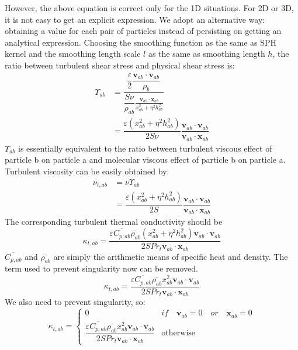 However, the above equation is correct only for the 1D situations. For 2D or 3D, it is not easy to get an explicit expression. 
We adopt an alternative way: obtaining a value for each pair of particles instead of persisting on getting an analytical expression. Choosing the smoothing function as the same as SPH kernel and the smoothing length scale $l$ as the same as smoothing length $h$, the ratio between turbulent shear stress and physical shear stress is: 
\begin{equation}
\begin{split}
\Upsilon_{ab} &= \dfrac{\dfrac{\varepsilon}{2} \dfrac{\textbf{v}_{ab} \cdot \textbf{v}_{ab}}{\rho_b}}{\dfrac{S \nu}{\rho_{ab}} \frac{\textbf{v}_{ab} \cdot \textbf{x}_{ab}}{x_{ab}^2 + \eta^2 h_{ab}^2}} \\
 & = \dfrac{\varepsilon \left(x_{ab}^2 + \eta^2 h_{ab}^2\right)}{2 S \nu} \dfrac{\textbf{v}_{ab} \cdot \textbf{v}_{ab}}{\textbf{v}_{ab} \cdot \textbf{x}_{ab}}
\end{split}
\end{equation}
$\Upsilon_{ab}$ is essentially equivalent to the ratio between turbulent viscous effect of particle b on particle a and molecular viscous effect of particle b on particle a. Turbulent viscosity can be easily obtained by:
\begin{equation}
\begin{split}
\nu_{t,ab} &= \nu \Upsilon_{ab} \\
&= \dfrac{\varepsilon \left(x_{ab}^2 + \eta^2 h_{ab}^2\right)}{2 S} \dfrac{\textbf{v}_{ab} \cdot \textbf{v}_{ab}}{\textbf{v}_{ab} \cdot \textbf{x}_{ab}}
\end{split}
\end{equation}
The corresponding turbulent thermal conductivity should be
\begin{equation}
\kappa_{t,ab}=\dfrac{\varepsilon \overline{C_{p,ab}} \overline{\rho_{ab}} \left(x_{ab}^2 + \eta^2 h_{ab}^2\right) \textbf{v}_{ab} \cdot \textbf{v}_{ab}}{2 S Pr_t\textbf{v}_{ab} \cdot \textbf{x}_{ab}}
\end{equation}
$\overline{C_{p,ab}}$ and $\overline{\rho_{ab}}$ are simply the arithmetic means of specific heat and density. The term used to prevent singularity now can be removed. 
\begin{equation}
\kappa_{t,ab}=\dfrac{\varepsilon \overline{C_{p,ab}} \overline{\rho_{ab}} x_{ab}^2 \textbf{v}_{ab} \cdot \textbf{v}_{ab}}{2 S Pr_t\textbf{v}_{ab} \cdot \textbf{x}_{ab} }
\end{equation}
We also need to prevent singularity, so: 
\begin{equation}
\kappa_{t,ab}= 
\begin{cases} 
      0 & if  \quad \textbf{v}_{ab}=0 \quad or \quad \textbf{x}_{ab}=0 \\
      \dfrac{\varepsilon \overline{C_{p,ab}} \overline{\rho_{ab}} x_{ab}^2 \textbf{v}_{ab} \cdot \textbf{v}_{ab}}{2 S Pr_t\textbf{v}_{ab} \cdot \textbf{x}_{ab} } & \text{otherwise}
\end{cases}
\label{eq:SPH-LANS-heat-conductivity}
\end{equation}

